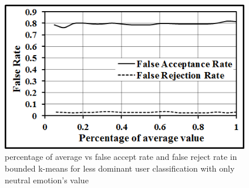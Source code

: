 \begin{figure}
\centering
\includegraphics[width=4.25in,clip,keepaspectratio]{Chapters/figures/User/lessDominantWithNeutral/fAfR}
\caption{percentage of average vs false accept rate and false reject rate in bounded k-means for less dominant user classification with only neutral emotion's value}
\label{Optional 6}
\end{figure}




%
%
%
%
%

